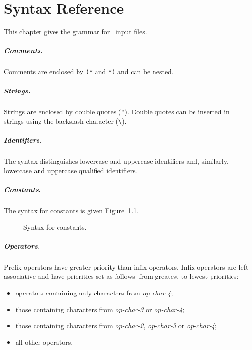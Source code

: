 \chapter{Syntax Reference}
\label{chap:syntaxref}

This chapter gives the grammar for \why\ input files.


\paragraph{Comments.}
Comments are enclosed by \texttt{(*} and \texttt{*)} and can be nested.

\paragraph{Strings.}
Strings are enclosed by double quotes (\verb!"!). Double quotes can be
inserted in strings using the backslash character (\verb!\!).


\paragraph{Identifiers.} The syntax distinguishes lowercase and
uppercase identifiers and, similarly, lowercase and uppercase
qualified identifiers.
 
\begin{center}\framebox{}\end{center}

\paragraph{Constants.}
The syntax for constants is given Figure~\ref{fig:bnf:constant}.

\begin{figure}[p]
\begin{center}\framebox{}\end{center}
  \caption{Syntax for constants.}
\label{fig:bnf:constant}
\end{figure}

\paragraph{Operators.} Prefix operators have greater priority than
infix operators. Infix operators are left associative and have
priorities set as follows, from greatest to lowest priorities:
\begin{itemize}
\item operators containing only characters from
\textit{op-char-4};
\item those containing
 characters from \textit{op-char-3} or \textit{op-char-4};
\item those containing
 characters from \textit{op-char-2}, \textit{op-char-3} or
 \textit{op-char-4}; 
\item all other operators.
\end{itemize}

